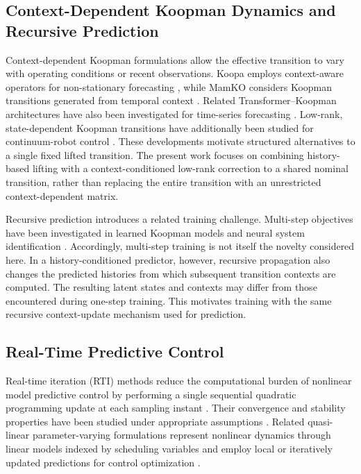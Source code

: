 \documentclass[journal]{IEEEtran}
\begin{document}
\subsection{Context-Dependent Koopman Dynamics and Recursive Prediction}

Context-dependent Koopman formulations allow the effective transition to vary with operating conditions or recent observations. Koopa employs context-aware operators for non-stationary forecasting \cite{liu2023koopa}, while MamKO considers Koopman transitions generated from temporal context \cite{li2025mamko}. Related Transformer--Koopman architectures have also been investigated for time-series forecasting \cite{forootani2025deepkoopformer, forootani2026spectral}. Low-rank, state-dependent Koopman transitions have additionally been studied for continuum-robot control \cite{feizi2025deepkoopman}. These developments motivate structured alternatives to a single fixed lifted transition. The present work focuses on combining history-based lifting with a context-conditioned low-rank correction to a shared nominal transition, rather than replacing the entire transition with an unrestricted context-dependent matrix.

Recursive prediction introduces a related training challenge. Multi-step objectives have been investigated in learned Koopman models \cite{lusch2018deep, otto2019linearly, azencot2020forecasting, wu2026multistep} and neural system identification \cite{forgione2021dynonet}. Accordingly, multi-step training is not itself the novelty considered here. In a history-conditioned predictor, however, recursive propagation also changes the predicted histories from which subsequent transition contexts are computed. The resulting latent states and contexts may differ from those encountered during one-step training. This motivates training with the same recursive context-update mechanism used for prediction.

\subsection{Real-Time Predictive Control}

Real-time iteration (RTI) methods reduce the computational burden of nonlinear model predictive control by performing a single sequential quadratic programming update at each sampling instant \cite{diehl2005realtime, gros2020rti}. Their convergence and stability properties have been studied under appropriate assumptions \cite{diehl2005rtistability, zavala2009advancedstep}. Related quasi-linear parameter-varying formulations represent nonlinear dynamics through linear models indexed by scheduling variables and employ local or iteratively updated predictions for control optimization \cite{rugh2000gain, leith1998velocity, cisneros2016qlmpc, cisneros2020qlpv}.
\end{document}
